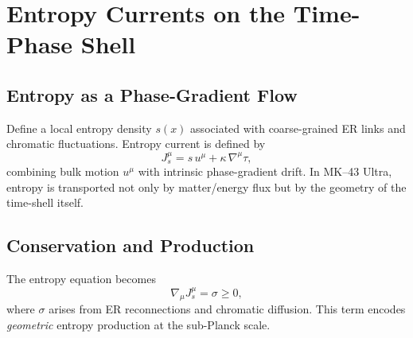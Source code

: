 \chapter{Entropy Currents on the Time-Phase Shell}

\section{Entropy as a Phase-Gradient Flow}

Define a local entropy density $s(x)$ associated with coarse-grained ER links and chromatic fluctuations.
Entropy current is defined by
\[
J^\mu_s = s\, u^\mu + \kappa\, \nabla^\mu \tau,
\]
combining bulk motion $u^\mu$ with intrinsic phase-gradient drift.
In MK--43 Ultra, entropy is transported not only by matter/energy flux but by the geometry of the time-shell itself.

\section{Conservation and Production}

The entropy equation becomes
\[
\nabla_\mu J^\mu_s = \sigma \ge 0,
\]
where $\sigma$ arises from ER reconnections and chromatic diffusion.
This term encodes \emph{geometric} entropy production at the sub-Planck scale.

